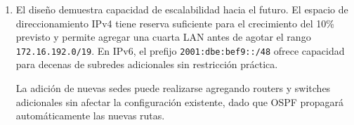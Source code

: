 \begin{enumerate}
\begin{itemize}
\item Direccionamiento correcto en IPv4 e IPv6
\item Conectividad plena entre todos los segmentos (L3)
\item Disponibilidad de servicios
\item Mecanismos de seguridad operativos
\end{itemize}

\item
El diseño demuestra capacidad de escalabilidad hacia el futuro. El espacio de
direccionamiento IPv4 tiene reserva suficiente para el crecimiento del 10\%
previsto y permite agregar una cuarta LAN antes de agotar el rango
\texttt{172.16.192.0/19}. En IPv6, el prefijo \texttt{2001:dbe:bef9::/48}
ofrece capacidad para decenas de subredes adicionales sin restricción práctica.

La adición de nuevas sedes puede realizarse agregando routers y switches
adicionales sin afectar la configuración existente, dado que OSPF propagará
automáticamente las nuevas rutas.


\end{enumerate}

